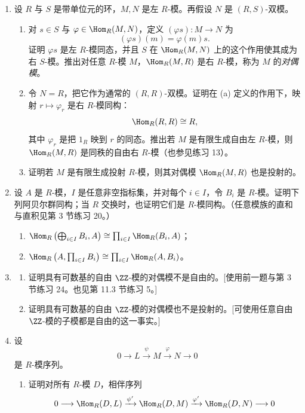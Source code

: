 \begin{enumerate}[label=\arabic*.]
\begin{enumerate}[label=(\alph*)]
	\end{enumerate}
	\item 设 $R$ 与 $S$ 是带单位元的环，$M,N$ 是左 $R$-模。再假设 $N$ 是 $(R,S)$-双模。
	\begin{enumerate}[label=(\alph*)]
		\item 对 $s\in S$ 与 $\varphi\in\Hom_R(M,N)$，定义 $(\varphi s):M\to N$ 为
		\[
		(\varphi s)(m)=\varphi(m)s.
		\]
		证明 $\varphi s$ 是左 $R$-模同态，并且 $S$ 在 $\Hom_R(M,N)$ 上的这个作用使其成为右 $S$-模。推出对任意 $R$-模 $M$，$\Hom_R(M,R)$ 是右 $R$-模，称为 $M$ 的\emph{对偶模}。
		\item 令 $N=R$，把它作为通常的 $(R,R)$-双模。证明在 (a) 定义的作用下，映射 $r\mapsto\varphi_r$ 是右 $R$-模同构：
		\[
		\Hom_R(R,R)\cong R,
		\]
		其中 $\varphi_r$ 是把 $1_R$ 映到 $r$ 的同态。推出若 $M$ 是有限生成自由左 $R$-模，则 $\Hom_R(M,R)$ 是同秩的自由右 $R$-模（也参见练习 13）。
		\item 证明若 $M$ 是有限生成投射 $R$-模，则其对偶模 $\Hom_R(M,R)$ 也是投射的。
	\end{enumerate}
	\item 设 $A$ 是 $R$-模，$I$ 是任意非空指标集，并对每个 $i\in I$，令 $B_i$ 是 $R$-模。证明下列阿贝尔群同构；当 $R$ 交换时，也证明它们是 $R$-模同构。（任意模族的直和与直积见第 3 节练习 20。）
	\begin{enumerate}[label=(\alph*)]
		\item $\Hom_R\left(\bigoplus_{i\in I}B_i,A\right)\cong\prod_{i\in I}\Hom_R(B_i,A)$；
		\item $\Hom_R\left(A,\prod_{i\in I}B_i\right)\cong\prod_{i\in I}\Hom_R(A,B_i)$。
	\end{enumerate}
	\item
	\begin{enumerate}[label=(\alph*)]
		\item 证明具有可数基的自由 $\ZZ$-模的对偶模不是自由的。[使用前一题与第 3 节练习 24。也见第 11.3 节练习 5。]
		\item 证明具有可数基的自由 $\ZZ$-模的对偶模也不是投射的。[可使用任意自由 $\ZZ$-模的子模都是自由的这一事实。]
	\end{enumerate}
	\item 设
	\[
	0\longrightarrow L\xrightarrow{\psi}M\xrightarrow{\varphi}N\longrightarrow0
	\]
	是 $R$-模序列。
	\begin{enumerate}[label=(\alph*)]
		\item 证明对所有 $R$-模 $D$，相伴序列
		\[
		0\longrightarrow\Hom_R(D,L)\xrightarrow{\psi'}\Hom_R(D,M)
		\xrightarrow{\varphi'}\Hom_R(D,N)\longrightarrow0
\]
\end{enumerate}
\end{enumerate}
